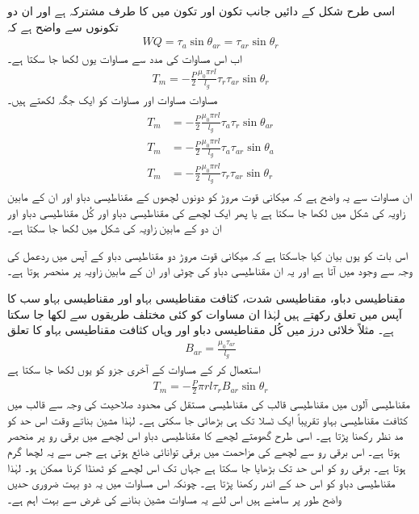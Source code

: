 اسی طرح شکل   کے دائیں جانب تکون  اور تکون  میں  کا طرف مشترکہ ہے اور ان دو تکونوں سے واضح ہے کہ
\begin{align}
WQ=\tau_a \sin \theta_{ar}=\tau_{ar} \sin \theta_r
\end{align}
اب اس مساوات کی مدد سے مساوات   یوں لکھا جا سکتا ہے۔
\begin{align}\label{مساوات_گھومتے_مشین_مروڑ_بذریعہ_کوتوانائی_پ}
T_m=-\frac{P}{2}\frac{\mu_0 \pi r l}{l_g} \tau_r \tau_{ar}  \sin \theta_r
\end{align}
مساوات   مساوات   اور مساوات   کو ایک جگہ لکھتے ہیں۔
\begin{gather}
\begin{aligned}\label{مساوات_گھومتے_مشین_مروڑ_بذریعہ_کوتوانائی_ت}
T_m&=-\frac{P}{2}\frac{\mu_0 \pi r l}{l_g} \tau_a \tau_r \sin \theta_{ar}\\
T_m&=-\frac{P}{2}\frac{\mu_0 \pi r l}{l_g} \tau_a \tau_{ar}  \sin \theta_a\\
T_m&=-\frac{P}{2}\frac{\mu_0 \pi r l}{l_g} \tau_r \tau_{ar}  \sin \theta_r
\end{aligned}
\end{gather}
ان مساوات سے یہ واضح ہے کہ میکانی قوت مروڑ کو دونوں لچھوں کے مقناطیسی دباو اور ان کے مابین زاویہ کی شکل میں لکھا جا سکتا ہے یا پھر ایک لچھے کی مقناطیسی دباو اور کُل مقناطیسی دباو اور ان دو کے مابین زاویہ کی شکل میں لکھا جا سکتا ہے۔

اس بات کو یوں بیان کیا جاسکتا ہے کہ میکانی قوت مروڑ دو مقناطیسی دباو کے آپس میں ردعمل کی وجہ سے وجود میں آتا ہے اور یہ ان مقناطیسی دباو کی چوٹی اور ان کے مابین زاویہ پر منحصر ہوتا ہے۔

مقناطیسی دباو، مقناطیسی شدت، کثافت مقناطیسی بہاو اور مقناطیسی بہاو سب کا آپس میں تعلق رکھتے ہیں لہٰذا ان مساوات کو کئی مختلف طریقوں سے لکھا جا سکتا ہے۔ مثلاً خلائی درز میں کُل مقناطیسی دباو  اور  وہاں کثافت مقناطیسی بہاو  کا تعلق
\begin{align}
B_{ar}=\frac{\mu_0 \tau_{ar}}{l_g}
\end{align}
استعمال کر کے مساوات   کے آخری جزو کو یوں لکھا جا سکتا ہے
\begin{align}
T_m=-\frac{P}{2} \pi r l \tau_r B_{ar} \sin \theta_r
\end{align}
مقناطیسی آلوں میں مقناطیسی قالب کی مقناطیسی مستقل   کی محدود صلاحیت کی وجہ سے قالب میں کثافت مقناطیسی بہاو تقریباً ایک ٹسلا تک ہی بڑھائی جا سکتی ہے۔ لہٰذا مشین بناتے وقت اس حد کو مد نظر رکھنا پڑتا ہے۔ اسی طرح گھومتے لچھے کا مقناطیسی دباو اس لچھے میں برقی رو پر منحصر ہوتا ہے۔ اس برقی رو سے لچھے کی مزاحمت میں برقی توانائی ضائع ہوتی ہے جس سے یہ لچھا گرم ہوتا ہے۔ برقی رو کو اس حد تک بڑھایا جا سکتا ہے جہاں تک اس لچھے کو ٹھنڈا کرنا ممکن ہو۔ لہٰذا مقناطیسی دباو کو اس حد کے اندر رکھنا پڑتا ہے۔ چونکہ اس مساوات میں یہ دو بہت ضروری حدیں واضح طور پر سامنے ہیں اس لئے یہ مساوات مشین بنانے کی غرض سے بہت اہم ہے۔

